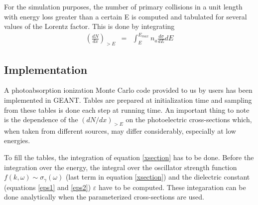 For the simulation purposes, the number of primary collisions
in a unit length
with energy loss greater than a certain E
is computed and tabulated for several values of the Lorentz factor.
This is done by integrating
\begin{eqnarray}
\left( \frac{dN}{dx} \right)_{>E}
& = &\int_E^{E_{max}} n_a \frac{d\sigma}{dE} dE
\label{integ}
\end{eqnarray}

\subsection{Implementation}
A photoabsorption ionization Monte Carlo code provided to us by users
has been implemented in {\sc GEANT}. Tables are
prepared at initialization time and sampling from these
tables is done each step at running time. An important
thing to note is the dependence of the $(dN/dx)_{>E}$
on the photoelectric
cross-sections which, when taken from different sources,
may differ considerably, especially at low energies.

To fill the tables, the integration of equation \ref{xsection}
has to be done.
Before the integration over the energy, the integral
over
the oscillator strength function $f(k,\omega) \sim
\sigma_{\gamma}(\omega)$ (last term in equation \ref{xsection})
and the dielectric constant (equations \ref{eps1} and \ref{eps2})
$\varepsilon$ have to be computed. These integaration
can be done analytically when the parameterized cross-sections
are used.

